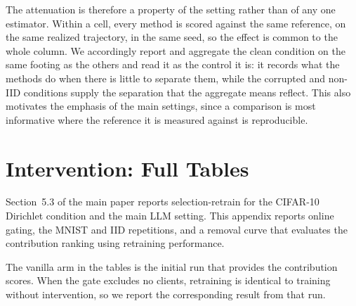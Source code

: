 \documentclass[letterpaper]{article} %
\theoremstyle{plain}
\begin{document}
The attenuation is therefore a property of the setting rather than of any one
estimator. Within a cell, every method is scored against the same reference,
on the same realized trajectory, in the same seed, so the effect is common to
the whole column. We accordingly report and aggregate the clean condition on
the same footing as the others and read it as the control it is: it records
what the methods do when there is little to separate them, while the corrupted
and non-IID conditions supply the separation that the aggregate means reflect.
This also motivates the emphasis of the main settings, since a comparison is
most informative where the reference it is measured against is reproducible.


\section{Intervention: Full Tables}
\label{app:intervention}

Section~5.3 of the main paper reports selection-retrain for the CIFAR-10
Dirichlet condition and the main LLM setting. This appendix reports online
gating, the MNIST and IID repetitions, and a removal curve that evaluates the
contribution ranking using retraining performance.

The vanilla arm in the tables is the initial run that provides the
contribution scores. When the gate excludes no clients, retraining is
identical to training without intervention, so we report the corresponding
result from that run.
\end{document}
